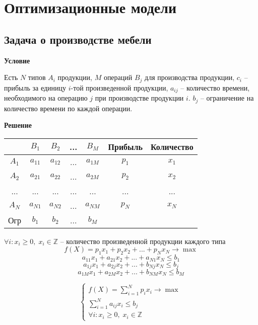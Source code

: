 \documentclass[12pt]{article}
\theoremstyle{definition}
\theoremstyle{remark}
\begin{document}
\section{Оптимизационные модели}
\subsection{Задача о производстве мебели}

\textbf{Условие}

Есть $N$ типов $A_i$ продукции, $M$ операций $B_j$ для производства продукции, $c_i$ -- прибыль за единицу $i$-той произведенной продукции, $a_{ij}$ -- количество времени, необходимого на операцию $j$ при производстве продукции $i$. $b_j$ -- ограничение на количество времени по каждой операции.

\textbf{Решение}
\begin{center}
    \begin{tabular}{ |c|c|c|c|c|c|c|}
         \hline
               & $B_1$   & $B_2$   & ...     & $B_M$   & Прибыль & Количество \\
         \hline
         $A_1$ & $a_{11}$& $a_{12}$& ...     & $a_{1M}$& $p_1$   & $x_1$      \\
         $A_2$ & $a_{21}$& $a_{22}$& ...     & $a_{2M}$& $p_2$   & $x_2$      \\
         ...   & ...     & ...     & ...     & ...     & ...     & ...        \\
         $A_N$ & $a_{N1}$& $a_{N2}$& ...     & $a_{NM}$& $p_N$   & $x_N$      \\
         \hline
         Огр   & $b_1$   & $b_2$   & ...     & $b_M$   &         &            \\
         \hline
    \end{tabular}
\end{center}

$\forall i: x_i \geqslant 0, \; x_i \in \mathbb{Z}$ -- количество произведенной продукции каждого типа
$$f(X) = p_1 x_1 + p_2 x_2 + ... + p_N x_N \rightarrow \max$$
$$a_{11} x_1 + a_{21} x_2 + ... + a_{N1} x_N \leqslant b_1$$
$$a_{1j} x_1 + a_{2j} x_2 + ... + b_{Nj} x_N \leqslant b_j$$
$$a_{1M} x_1 + a_{2M} x_2 + ... + b_{NM} x_N \leqslant b_M$$

$$\begin{cases}
    f(X) = \sum_{i=1}^N p_i x_i \rightarrow \max \\
    \sum_{i=1}^N a_{ij} x_i \leqslant b_j \\
    \forall i: x_i \geqslant 0, \; x_i \in \mathbb{Z}
\end{cases}$$
\end{document}
